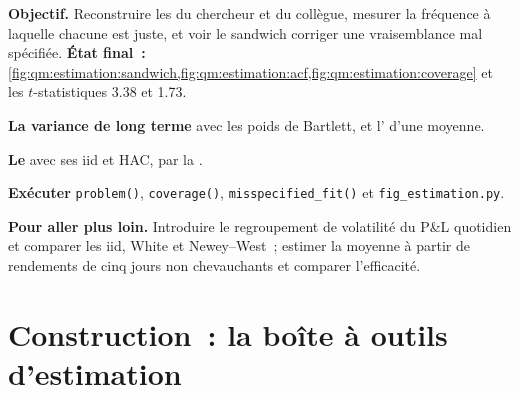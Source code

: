 \begin{tutorial}
\textbf{Objectif.} Reconstruire les  du chercheur et du collègue, mesurer la fréquence à laquelle chacune est juste, et voir le
sandwich corriger une vraisemblance mal spécifiée. \textbf{État final~:}
\cref{fig:qm:estimation:sandwich,fig:qm:estimation:acf,fig:qm:estimation:coverage} et les $t$-statistiques 3.38 et 1.73.
\begin{tutsteps}
\item \textbf{La variance de long terme} avec les poids de Bartlett, et l' d'une moyenne.
\label{lst:qm:estimation:nw}
\item \textbf{Le } avec ses  iid et HAC, par la .
\label{lst:qm:estimation:sharpe}
\item \textbf{Exécuter} \texttt{problem()}, \texttt{coverage()}, \texttt{misspecified\_fit()} et \texttt{fig\_estimation.py}.
\end{tutsteps}
\textbf{Pour aller plus loin.} Introduire le regroupement de volatilité du P\&L quotidien et comparer les  iid, White et Newey--West~;
estimer la moyenne à partir de rendements de cinq jours non chevauchants et comparer l'efficacité.
\end{tutorial}

\section{Construction~: la boîte à outils d'estimation}\label{bld:qm:estimation:estim}

